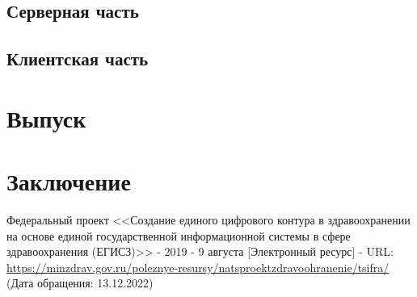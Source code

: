 \documentclass[a4paper,article]{article}
\begin{document}
    \subsection{Серверная часть}

    \subsection{Клиентская часть}

    \newpage

    \section{Выпуск}

    \newpage

    \section*{Заключение}

    \newpage


    \begin{thebibliography}{}
         Федеральный проект <<Создание единого цифрового контура в здравоохранении на основе единой государственной информационной системы в сфере здравоохранения (ЕГИСЗ)>> - 2019 - 9 августа [Электронный ресурс] - URL: \url{https://minzdrav.gov.ru/poleznye-resursy/natsproektzdravoohranenie/tsifra/} (Дата обращения: 13.12.2022)
    \end{thebibliography}
\end{document}
